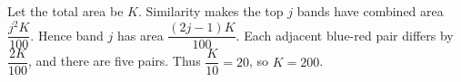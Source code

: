 Let the total area be $ K $. Similarity makes the top $ j $ bands have combined area $\dfrac{j^2K}{100}$. Hence band $ j $ has area $\dfrac{(2j-1)K}{100}$. Each adjacent blue-red pair differs by $\dfrac{2K}{100}$, and there are five pairs. Thus $\dfrac{K}{10}=20 $, so $\boxed{K=200}$.
